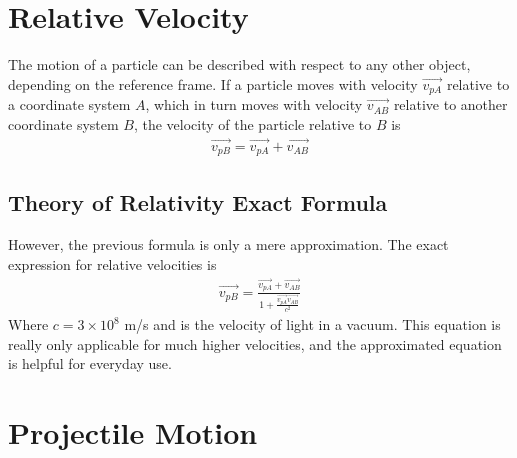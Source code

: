 \documentclass[11pt]{report}
\begin{document}
\section{Relative Velocity}

The motion of a particle can be described with respect to any other object, depending on the reference frame. If a particle moves with velocity $\Vec{v_{pA}}$ relative to a coordinate system $A$, which in turn moves with velocity $\Vec{v_{AB}}$ relative to another coordinate system $B$, the velocity of the particle relative to $B$ is 
\begin{align*}
    \Vec{v_{pB}} = \Vec{v_{pA}} + \Vec{v_{AB}}
\end{align*}

\subsection{Theory of Relativity Exact Formula}

However, the previous formula is only a mere approximation. The exact expression for relative velocities is
\begin{align*}
    \Vec{v_{pB}} = \frac{\Vec{v_{pA}} + \Vec{v_{AB}}}{1 + \frac{\Vec{v_{pA}}\Vec{v_{AB}}}{c^{2}}}
\end{align*}
Where $c = 3\times 10^{8}$ m/s and is the velocity of light in a vacuum. This equation is really only applicable for much higher velocities, and the approximated equation is helpful for everyday use.

\section{Projectile Motion}
\end{document}
